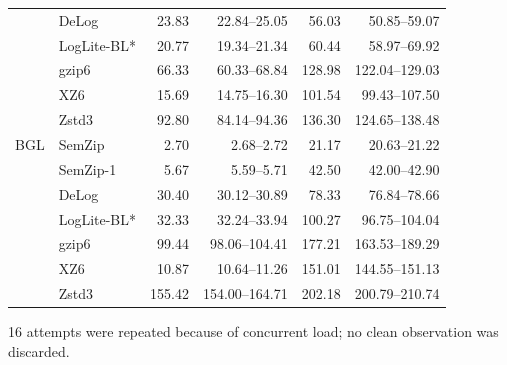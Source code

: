 \begin{longtable}{llrrrr}
 & DeLog & 23.83 & 22.84--25.05 & 56.03 & 50.85--59.07 \\
 & LogLite-BL* & 20.77 & 19.34--21.34 & 60.44 & 58.97--69.92 \\
 & gzip6 & 66.33 & 60.33--68.84 & 128.98 & 122.04--129.03 \\
 & XZ6 & 15.69 & 14.75--16.30 & 101.54 & 99.43--107.50 \\
 & Zstd3 & 92.80 & 84.14--94.36 & 136.30 & 124.65--138.48 \\
\midrule
BGL & SemZip & 2.70 & 2.68--2.72 & 21.17 & 20.63--21.22 \\
 & SemZip-1 & 5.67 & 5.59--5.71 & 42.50 & 42.00--42.90 \\
 & DeLog & 30.40 & 30.12--30.89 & 78.33 & 76.84--78.66 \\
 & LogLite-BL* & 32.33 & 32.24--33.94 & 100.27 & 96.75--104.04 \\
 & gzip6 & 99.44 & 98.06--104.41 & 177.21 & 163.53--189.29 \\
 & XZ6 & 10.87 & 10.64--11.26 & 151.01 & 144.55--151.13 \\
 & Zstd3 & 155.42 & 154.00--164.71 & 202.18 & 200.79--210.74 \\
\bottomrule
\end{longtable}
16 attempts were repeated because of concurrent load; no clean observation was discarded.
